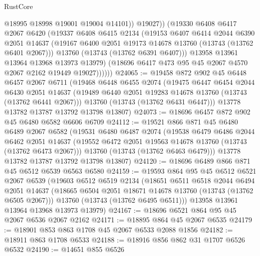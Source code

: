 \begin{lexlean}{RustCore}
\begin{coremodule}
                    @18995
                    @18998
                    @19001
                    @19004
                    @14101))
                @19027))
            (@19330
              @6408
              @6417
              @2067
              @6420
              (@19337
                @6408
                @6415
                @2134
                (@19153
                  @6407
                  @6414
                  @2044
                  @6390
                  @2051
                  @14637
                  (@19167 @6400 @2051 @19173 @14678 @13760 (@13743 (@13762 @6401 @2067)))
                  @13760
                  (@13743 (@13762 @6391 @6407)))
                @13958
                @13961
                @13964
                @13968
                @13973
                @13979)
              (@18696 @6417 @473 @95 @45 @2067 @4570 @2067 @2162 @19449 @19027))))))
@24065 := @19458
    @872
    @902
    @45
    @6448
    @6457
    @2067
    @6711
    (@19468
      @6448
      @6455
      @2074
      (@19475
        @6447
        @6454
        @2044
        @6430
        @2051
        @14637
        (@19489 @6440 @2051 @19283 @14678 @13760 (@13743 (@13762 @6441 @2067)))
        @13760
        (@13743 (@13762 @6431 @6447)))
      @13778
      @13782
      @13787
      @13792
      @13798
      @13807)
@24073 := @18696 @6457 @872 @902 @45 @6480 @6582 @6606 @6709
@24112 := @19521
    @866
    @871
    @45
    @6480
    @6489
    @2067
    @6582
    (@19531
      @6480
      @6487
      @2074
      (@19538
        @6479
        @6486
        @2044
        @6462
        @2051
        @14637
        (@19552 @6472 @2051 @19563 @14678 @13760 (@13743 (@13762 @6473 @2067)))
        @13760
        (@13743 (@13762 @6463 @6479)))
      @13778
      @13782
      @13787
      @13792
      @13798
      @13807)
@24120 := @18696 @6489 @866 @871 @45 @6512 @6539 @6563 @6580
@24159 := @19593
    @864
    @95
    @45
    @6512
    @6521
    @2067
    @6539
    (@19603
      @6512
      @6519
      @2134
      (@18651
        @6511
        @6518
        @2044
        @6494
        @2051
        @14637
        (@18665 @6504 @2051 @18671 @14678 @13760 (@13743 (@13762 @6505 @2067)))
        @13760
        (@13743 (@13762 @6495 @6511)))
      @13958
      @13961
      @13964
      @13968
      @13973
      @13979)
@24167 := @18696 @6521 @864 @95 @45 @2067 @6536 @2067 @2162
@24171 := @18895 @864 @45 @2067 @6535
@24179 := @18901 @853 @863 @1708 @45 @2067 @6533 @2088 @1856
@24182 := @18911 @863 @1708 @6533
@24188 := @18916 @856 @862 @31 @1707 @6526 @6532
@24190 := @14651 @855 @6526

\end{coremodule}
\end{lexlean}
